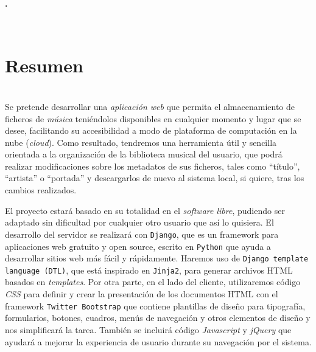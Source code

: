

\begin{center}
{\large\bfseries \myTitle. \mySubTitle}\\
\end{center}
\begin{center}
\myName\\
\end{center}

\section*{Resumen}

\bigskip
{}\\

Se pretende desarrollar una \textit{aplicación web} que permita el almacenamiento de ficheros de \textit{música} teniéndolos disponibles en cualquier momento y lugar que se desee, facilitando su accesibilidad a modo de plataforma de computación en la nube (\textit{cloud}). Como resultado, tendremos una herramienta útil y sencilla orientada a la organización de la biblioteca musical del usuario, que podrá realizar modificaciones sobre los metadatos de sus ficheros, tales como ``título'', ``artista'' o ``portada'' y descargarlos de nuevo al sistema local, si quiere, tras los cambios realizados.

El proyecto estará basado en su totalidad en el \textit{software libre}, pudiendo ser adaptado sin dificultad por cualquier otro usuario que así lo quisiera. El desarrollo del servidor se realizará con {\tt Django}, que es un framework para aplicaciones web gratuito y open source, escrito en {\tt Python} que ayuda a desarrollar sitios web más fácil y rápidamente. Haremos uso de {\tt Django template language (DTL)}, que está inspirado en {\tt Jinja2}, para generar archivos HTML basados en \textit{templates}. Por otra parte, en el lado del cliente, utilizaremos código \textit{CSS} para definir y crear la presentación de los documentos HTML con el framework {\tt Twitter Bootstrap} que contiene plantillas de diseño para tipografía, formularios, botones, cuadros, menús de navegación y otros elementos de diseño y nos simplificará la tarea. También se incluirá código \textit{Javascript} y \textit{jQuery} que ayudará a mejorar la experiencia de usuario durante su navegación por el sistema.

